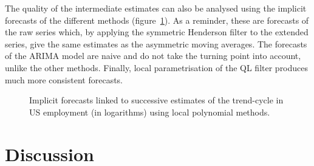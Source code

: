 \documentclass[
]{article}
\newcommand\1{\mathds{1}}
\begin{document}
The quality of the intermediate estimates can also be analysed using the
implicit forecasts of the different methods
(figure~\ref{fig-ce16ov-previmp-lp}). As a reminder, these are forecasts
of the raw series which, by applying the symmetric Henderson filter to
the extended series, give the same estimates as the asymmetric moving
averages. The forecasts of the ARIMA model are naive and do not take the
turning point into account, unlike the other methods. Finally, local
parametrisation of the QL filter produces much more consistent
forecasts.

\begin{figure}[H]

\caption{\label{fig-ce16ov-previmp-lp}Implicit forecasts linked to
successive estimates of the trend-cycle in US employment (in logarithms)
using local polynomial methods.}


\end{figure}%

\section{Discussion}\label{discussion}
\end{document}

